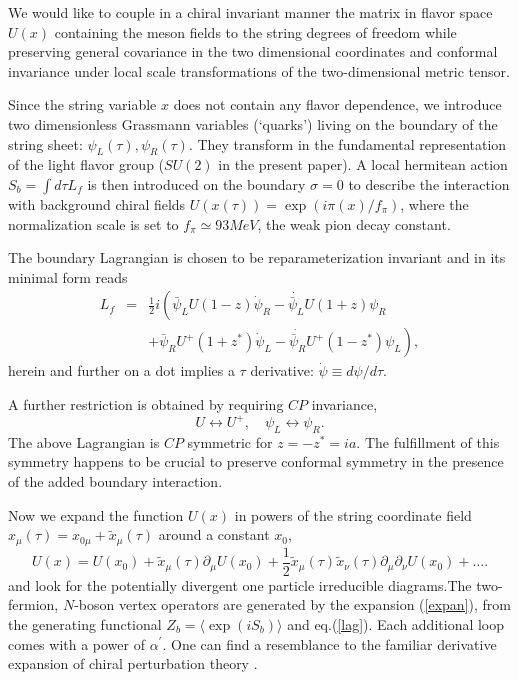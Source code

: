\documentclass[a4paper,12pt]{article}
\begin{document}
We would like to couple in a chiral invariant manner
the matrix in flavor space $U(x)$ containing  the meson fields to the
string degrees of freedom while preserving
general covariance in the two dimensional coordinates and conformal
invariance under local scale transformations
of the two-dimensional metric tensor.

Since the string variable $x$ does not contain any flavor dependence,
we introduce two dimensionless Grassmann variables (`quarks')
living on the
boundary of the string sheet: 
$\psi_L(\tau),\psi_R(\tau)$. They transform in the fundamental representation
of the light flavor group ($SU(2)$ in the present paper).
A local hermitean action $S_b = \int d\tau L_f$ is then introduced 
on the boundary
$ \sigma =0$ to describe the interaction with background chiral fields 
$U(x(\tau)) = \exp(i \pi(x)/f_\pi)$, where the normalization scale is
set to $f_\pi\simeq 93 MeV$, 
the weak pion decay constant.

The boundary Lagrangian is chosen to be reparameterization invariant
and in its minimal form reads 
\begin{eqnarray}
L_f&=&\frac12 i \left(\bar\psi_L U (1 - z) \dot\psi_R  - 
\dot{\bar\psi_L} U (1 +z)\psi_R \right.\nonumber\\
&&\left.+ \bar\psi_R U^+ (1 + z^*)
\dot\psi_L - \dot{\bar\psi_R} U^+ (1 - z^*) \psi_L\right), \label{lag}
\end{eqnarray}
herein and further on a dot implies a $\tau$ derivative: 
$\dot\psi \equiv d\psi/d\tau$. 

A further restriction is obtained by requiring $CP$ invariance,
\begin{equation}
U \leftrightarrow U^+, \quad \psi_L  \leftrightarrow  \psi_R.
\label{CP1}
\end{equation}
The above Lagrangian is $CP$ symmetric for $ z = - z^* = ia$.  
The fulfillment of this symmetry happens to be crucial to
preserve conformal symmetry in the presence of the added boundary interaction.

Now we expand the function $U(x)$ in powers of the string coordinate 
field $x_\mu(\tau) =x_{0\mu} + \tilde x_\mu(\tau) $ around a constant $x_0$,
\begin{equation}
U(x) = U(x_0) + \tilde x_\mu(\tau) \partial_\mu U(x_0) + 
\frac12 \tilde x_\mu(\tau) \tilde x_\nu(\tau) \partial_\mu\partial_\nu U(x_0) 
+\ldots. 
\label{expan}
\end{equation}
and look
for the potentially divergent
one particle irreducible diagrams.The two-fermion, 
$N$-boson vertex operators are generated by the expansion 
(\ref{expan}), from the generating functional 
$ Z_b = \langle\exp(i S_b)\rangle$ and eq.(\ref{lag}).
Each additional loop comes with a power of $\alpha^\prime$.
One can find a resemblance to the familiar 
derivative expansion of chiral perturbation theory \cite{GL}. 
\end{document}
